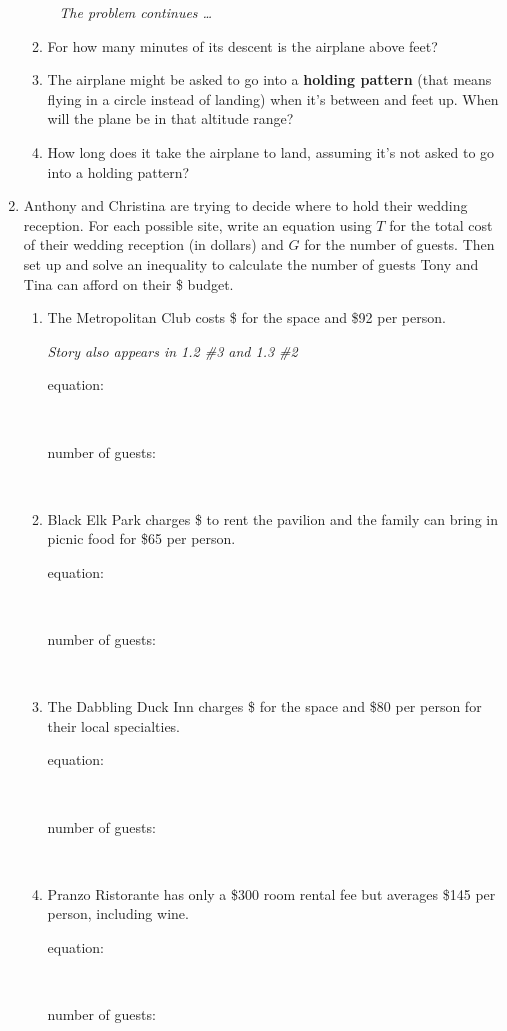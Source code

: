 \begin{enumerate}
\begin{enumerate}
\newpage %
~\hspace{-.5in} \emph{The problem continues \ldots}

\item For how many minutes of its descent is the airplane above  feet? \vfill
\item The airplane might be asked to go into a \textbf{holding pattern} (that means flying in a circle instead of landing) when it's between  and  feet up.  When will the plane be in that altitude range? \vfill
\item How long does it take the airplane to land, assuming it's not asked to go into a holding pattern? \vfill
\end{enumerate}

\newpage %

\item Anthony and Christina are trying to decide where to hold their wedding reception.  For each possible site, write an equation using $T$ for the total cost of their wedding reception (in dollars) and $G$ for the number of guests.  Then set up and solve an inequality to calculate the number of guests Tony and Tina can afford on their \$ budget.  
\begin{enumerate}
\item The Metropolitan Club costs \$ for the space and \$92 per person.
 
\hfill \emph{Story also appears in 1.2 \#3 and 1.3 \#2} \bigskip
\begin{description}
\item [equation:] ~\bigskip 
\item [number of guests:]  ~\vfill 
\end{description}  \bigskip
\item Black Elk Park charges  \$ to rent the pavilion and the family can bring in picnic food for  \$65 per person.
\begin{description}
\item [equation:] ~\bigskip 
\item [number of guests:]  ~\vfill 
\end{description}  \bigskip
\item The Dabbling Duck Inn charges  \$ for the space and \$80 per person for their local specialties. 
\begin{description}
\item [equation:] ~\bigskip 
\item [number of guests:]  ~\vfill 
\end{description}  \bigskip
\item Pranzo Ristorante has only a \$300 room rental fee but averages \$145 per person, including wine.
\begin{description}
\item [equation:] ~\bigskip 
\item [number of guests:]  ~\vfill 
\end{description}  \bigskip
\end{enumerate}


\end{enumerate}
